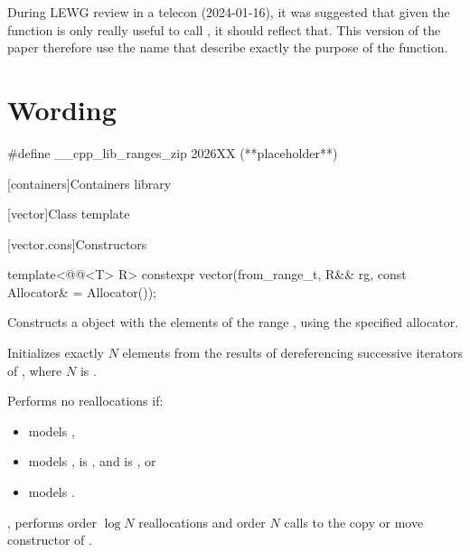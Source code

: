 \documentclass{wg21}
\begin{document}
During LEWG review in a telecon (2024-01-16), it was suggested that given the function is only really useful to call , it should reflect that.
This version of the paper therefore use the name  that describe exactly the purpose of the function.


\section{Wording}

\begin{addedblock}
\begin{codeblock}
    #define __cpp_lib_ranges_zip 2026XX (**placeholder**)
\end{codeblock}
\end{addedblock}

[containers]{Containers library}

[vector]{Class template }

[vector.cons]{Constructors}

%
\begin{itemdecl}
    template<@@<T> R>
    constexpr vector(from_range_t, R&& rg, const Allocator& = Allocator());
\end{itemdecl}

\begin{itemdescr}
    \pnum
    \effects
    Constructs a  object with the elements of the range ,
    using the specified allocator.

    \pnum
    \complexity
    Initializes exactly $N$ elements
    from the results of dereferencing successive iterators of ,
    where $N$ is .

\begin{addedblock}
    Performs no reallocations if:
    \begin{itemize}
    \item {} models ,
    \item {} models ,  is , and  is , or
    \item {} models .
    \end{itemize}
\end{addedblock}
     , performs order $\log N$ reallocations and
    order $N$ calls to the copy or move constructor of .
\end{itemdescr}
\end{document}
